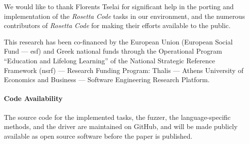 \documentclass[10pt]{sigplanconf}
\begin{document}
\acks

We would like to thank Florents Tselai for significant
help in the porting and implementation of the
{\em Rosetta Code} tasks in our environment,
and the numerous contributors of {\em Rosetta Code} for
making their efforts available to the public.

This research has been co-financed by
the European Union (European Social Fund --- {\sc esf})
and Greek national funds through the Operational Program
``Education and Lifelong Learning''
of the National Strategic Reference Framework ({\sc nsrf})
--- Research Funding Program:
Thalis ---
Athens University of Economics and Business ---
Software Engineering Research Platform.

\paragraph{Code Availability} The source code for
the implemented tasks,
the fuzzer,
the language-specific methods, and
the driver are maintained on GitHub, and
will be made publicly available as open source software
before the paper is published.








\end{document}

